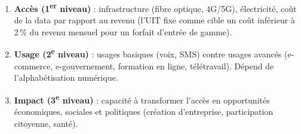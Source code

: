 \documentclass[11pt]{article}
\begin{document}
\begin{methode}
\begin{enumerate}
    \item \textbf{Accès (1\textsuperscript{er} niveau)} : infrastructure (fibre optique, 4G/5G), électricité, coût de la data par rapport au revenu (l'UIT fixe comme cible un coût inférieur à 2\,\% du revenu mensuel pour un forfait d'entrée de gamme).
    \item \textbf{Usage (2\textsuperscript{e} niveau)} : usages basiques (voix, SMS) contre usages avancés (e-commerce, e-gouvernement, formation en ligne, télétravail). Dépend de l'alphabétisation numérique.
    \item \textbf{Impact (3\textsuperscript{e} niveau)} : capacité à transformer l'accès en opportunités économiques, sociales et politiques (création d'entreprise, participation citoyenne, santé).
\end{enumerate}
\end{methode}
\end{document}
